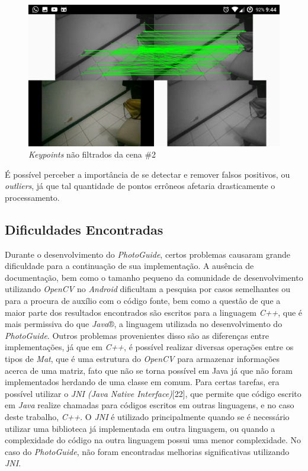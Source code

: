 \begin{figure}[!htb]
	\centering
		\includegraphics[width= \textwidth]{Imagens/figura3-11.png}
	\caption{\textit{Keypoints} não filtrados da cena \#2}
	\label{fig3:11}
\end{figure}


É possível perceber a importância de se detectar e remover falsos positivos, ou \textit{outliers}, já que tal quantidade de pontos errôneos afetaria drasticamente o processamento.

\subsection{Dificuldades Encontradas}

Durante o desenvolvimento do \textit{PhotoGuide}, certos problemas causaram grande dificuldade para a continuação de sua implementação. A ausência de documentação, bem como o tamanho pequeno da comunidade de desenvolvimento utilizando \textit{OpenCV} no \textit{Android} dificultam a pesquisa por casos semelhantes ou para a procura de auxílio com o código fonte, bem como a questão de que a maior parte dos resultados encontrados são escritos para a linguagem \textit{C++}, que é mais permissiva do que \textit{Java}®, a linguagem utilizada no desenvolvimento do \textit{PhotoGuide}. Outros problemas provenientes disso são as diferenças entre implementações, já que em \textit{C++}, é possível realizar diversas operações entre os tipos de \textit{Mat},  que é uma estrutura do \textit{OpenCV} para armazenar informações acerca de uma matriz, fato que não se torna possível em Java já que não foram implementados herdando de uma classe em comum. Para certas tarefas, era possível utilizar o \textit{JNI (Java Native Interface)}[22], que permite que código escrito em \textit{Java }realize chamadas para códigos escritos em outras linguagens, e no caso deste trabalho, \textit{C++}. O \textit{JNI} é utilizado principalmente quando se é necessário utilizar uma biblioteca já implementada em outra linguagem, ou quando a complexidade do código na outra linguagem possui uma menor complexidade. No caso do \textit{PhotoGuide}, não foram encontradas melhorias significativas utilizando \textit{JNI}. 

